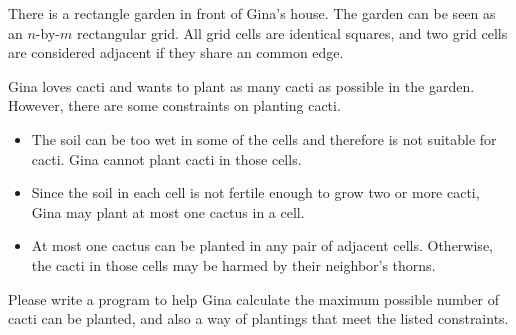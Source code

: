 There is a rectangle garden in front of Gina's house.
The garden can be seen as an $n$-by-$m$ rectangular grid.
All grid cells are identical squares, and two grid cells are 
considered adjacent if they share an common edge.

Gina loves cacti and wants to plant as many cacti as possible in the garden.
However, there are some constraints on planting cacti.
\begin{itemize}
\item The soil can be too wet in some of the cells and therefore is not 
      suitable for cacti. Gina cannot plant cacti in those cells.
\item Since the soil in each cell is not fertile enough to grow two or more 
      cacti, Gina may plant at most one cactus in a cell.
\item At most one cactus can be planted in any pair of adjacent cells. 
      Otherwise, the cacti in those cells may be harmed by their neighbor's
      thorns.
\end{itemize}

Please write a program to help Gina calculate the maximum possible number of 
cacti can be planted, and also a way of plantings that meet the listed 
constraints.
